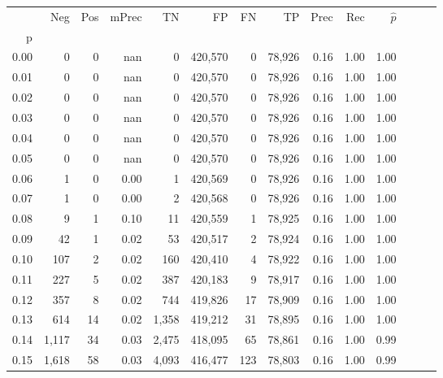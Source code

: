 \begin{tabular}{rrrrrrrrrrrrrr}
\toprule
{} &     Neg &    Pos & mPrec &       TN &       FP &      FN &      TP &  Prec &   Rec & $\hat{p}$ \\
p    &         &        &       &          &          &         &         &       &       &           \\
\midrule
0.00 &       0 &      0 &   nan &        0 &  420,570 &       0 &  78,926 &  0.16 &  1.00 &      1.00 \\
0.01 &       0 &      0 &   nan &        0 &  420,570 &       0 &  78,926 &  0.16 &  1.00 &      1.00 \\
0.02 &       0 &      0 &   nan &        0 &  420,570 &       0 &  78,926 &  0.16 &  1.00 &      1.00 \\
0.03 &       0 &      0 &   nan &        0 &  420,570 &       0 &  78,926 &  0.16 &  1.00 &      1.00 \\
0.04 &       0 &      0 &   nan &        0 &  420,570 &       0 &  78,926 &  0.16 &  1.00 &      1.00 \\
0.05 &       0 &      0 &   nan &        0 &  420,570 &       0 &  78,926 &  0.16 &  1.00 &      1.00 \\
0.06 &       1 &      0 &  0.00 &        1 &  420,569 &       0 &  78,926 &  0.16 &  1.00 &      1.00 \\
0.07 &       1 &      0 &  0.00 &        2 &  420,568 &       0 &  78,926 &  0.16 &  1.00 &      1.00 \\
0.08 &       9 &      1 &  0.10 &       11 &  420,559 &       1 &  78,925 &  0.16 &  1.00 &      1.00 \\
0.09 &      42 &      1 &  0.02 &       53 &  420,517 &       2 &  78,924 &  0.16 &  1.00 &      1.00 \\
0.10 &     107 &      2 &  0.02 &      160 &  420,410 &       4 &  78,922 &  0.16 &  1.00 &      1.00 \\
0.11 &     227 &      5 &  0.02 &      387 &  420,183 &       9 &  78,917 &  0.16 &  1.00 &      1.00 \\
0.12 &     357 &      8 &  0.02 &      744 &  419,826 &      17 &  78,909 &  0.16 &  1.00 &      1.00 \\
0.13 &     614 &     14 &  0.02 &    1,358 &  419,212 &      31 &  78,895 &  0.16 &  1.00 &      1.00 \\
0.14 &   1,117 &     34 &  0.03 &    2,475 &  418,095 &      65 &  78,861 &  0.16 &  1.00 &      0.99 \\
0.15 &   1,618 &     58 &  0.03 &    4,093 &  416,477 &     123 &  78,803 &  0.16 &  1.00 &      0.99 \\

\end{tabular}
